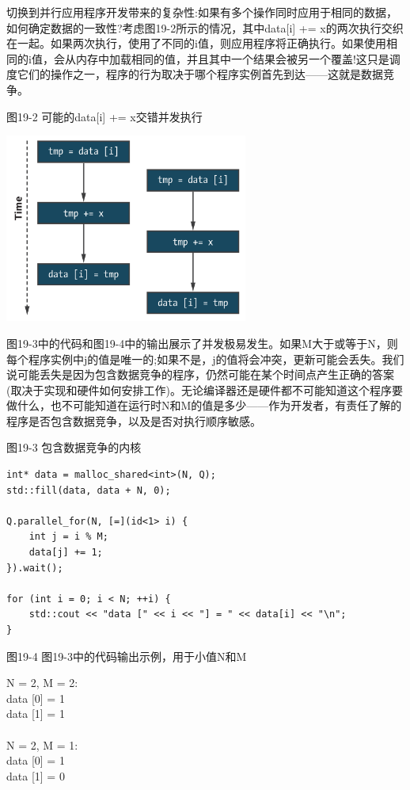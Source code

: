 切换到并行应用程序开发带来的复杂性:如果有多个操作同时应用于相同的数据，如何确定数据的一致性?考虑图19-2所示的情况，其中data[i] += x的两次执行交织在一起。如果两次执行，使用了不同的i值，则应用程序将正确执行。如果使用相同的i值，会从内存中加载相同的值，并且其中一个结果会被另一个覆盖!这只是调度它们的操作之一，程序的行为取决于哪个程序实例首先到达——这就是数据竞争。\par

\hspace*{\fill} \par %
图19-2 可能的data[i] += x交错并发执行
\begin{center}
	\includegraphics[width=0.6\textwidth]{content/chapter-19/images/3}
\end{center}

图19-3中的代码和图19-4中的输出展示了并发极易发生。如果M大于或等于N，则每个程序实例中j的值是唯一的;如果不是，j的值将会冲突，更新可能会丢失。我们说可能丢失是因为包含数据竞争的程序，仍然可能在某个时间点产生正确的答案(取决于实现和硬件如何安排工作)。无论编译器还是硬件都不可能知道这个程序要做什么，也不可能知道在运行时N和M的值是多少——作为开发者，有责任了解的程序是否包含数据竞争，以及是否对执行顺序敏感。\par

\hspace*{\fill} \par %
图19-3 包含数据竞争的内核
\begin{lstlisting}[caption={}]
int* data = malloc_shared<int>(N, Q);
std::fill(data, data + N, 0);

Q.parallel_for(N, [=](id<1> i) {
	int j = i % M;
	data[j] += 1;
}).wait();

for (int i = 0; i < N; ++i) {
	std::cout << "data [" << i << "] = " << data[i] << "\n";
}
\end{lstlisting}

\hspace*{\fill} \par %
图19-4 图19-3中的代码输出示例，用于小值N和M
\begin{tcolorbox}[colback=white,colframe=black]
N = 2, M = 2:\\
data [0] = 1\\
data [1] = 1\\
\\
N = 2, M = 1:\\
data [0] = 1\\
data [1] = 0
\end{tcolorbox}

